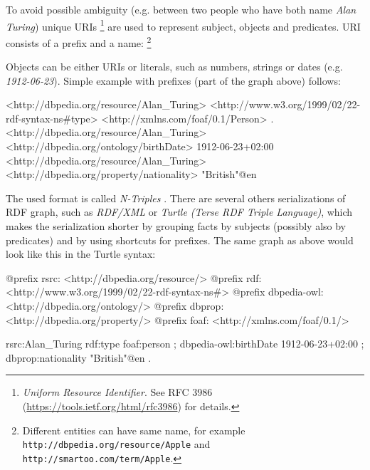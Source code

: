 \documentclass[12pt, twoside]{fithesis2}
\renewcommand{\_}{\leavevmode \kern0.07em\vbox{\hrule width0.4em}}
\begin{document}
To avoid possible ambiguity (e.g. between two people who have both name \textit{Alan Turing})
unique URIs%
\footnote{\emph{Uniform Resource Identifier}. See RFC 3986 (\url{https://tools.ietf.org/html/rfc3986}) for details.}
are used to represent subject, objects and predicates.
URI consists of a prefix and a name:%
\footnote{Different entities can have same name, for example \texttt{http://dbpedia.org/resource/Apple} and \texttt{http://smartoo.com/term/Apple}.}
\begin{center}
\end{center}
\noindent
Objects can be either URIs or literals, such as numbers, strings or dates (e.g. \emph{1912-06-23}).
Simple example with prefixes (part of the graph above) follows:
\begin{code}
<http://dbpedia.org/resource/Alan_Turing>
    <http://www.w3.org/1999/02/22-rdf-syntax-ns#type>
    <http://xmlns.com/foaf/0.1/Person> .
<http://dbpedia.org/resource/Alan_Turing>
    <http://dbpedia.org/ontology/birthDate>
    1912-06-23+02:00
<http://dbpedia.org/resource/Alan_Turing>
   <http://dbpedia.org/property/nationality>
   "British"@en
\end{code}

The used format is called \textit{N-Triples} \cite[][68]{semantic-web}.
There are several others serializations of RDF graph, such as \textit{RDF/XML}
\cite[][73]{semantic-web}
or \emph{Turtle (Terse RDF Triple Language)},
which makes the serialization shorter by grouping facts by subjects (possibly also by predicates) and by using shortcuts for prefixes. The same graph as above would look like this in the Turtle syntax:

\begin{code}
@prefix rsrc: <http://dbpedia.org/resource/>
@prefix rdf: <http://www.w3.org/1999/02/22-rdf-syntax-ns#>
@prefix dbpedia-owl: <http://dbpedia.org/ontology/>
@prefix dbprop: <http://dbpedia.org/property/>
@prefix foaf: <http://xmlns.com/foaf/0.1/>

rsrc:Alan_Turing
  rdf:type foaf:person ;
  dbpedia-owl:birthDate 1912-06-23+02:00 ;
  dbprop:nationality "British"@en .
\end{code}
\end{document}

